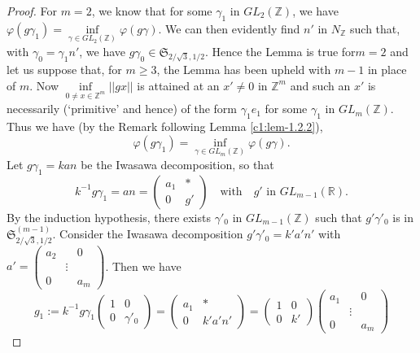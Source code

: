 \begin{proof}
For $m=2$, we know that for some $\gamma_{1}$ in $GL_{2}(\mathbb{Z})$,
we have $\varphi(g\gamma_{1})=\inf\limits_{\gamma\in
  GL_{2}(\mathbb{Z})}\varphi(g\gamma)$. We can then evidently find
$n'$ in $N_{\mathbb{Z}}$ such that, with $\gamma_{0}=\gamma_{1}n'$, we
have $g\gamma_{0}\in\mathfrak{S}_{2/\sqrt{3},1/2}$. Hence the Lemma is
true for\pageoriginale $m=2$ and let us suppose that, for $m\geq 3$,
the Lemma has been upheld with  $m-1$ in place of $m$. Now
$\inf\limits_{0\neq x\in \mathbb{Z}^{m}}||gx||$ is attained at an
$x'\neq 0$ in $\mathbb{Z}^{m}$ and such an $x'$ is necessarily
(`primitive' and hence) of the form $\gamma_{1}e_{1}$ for some
$\gamma_{1}$ in $GL_{m}(\mathbb{Z})$. Thus we have (by the Remark
following Lemma \ref{c1:lem-1.2.2}),
\begin{equation*}
\varphi(g\gamma_{1})=\inf\limits_{\gamma\in
  GL_{m}(\mathbb{Z})}\varphi(g\gamma).\tag{11}\label{c1:eq11} 
\end{equation*}
Let $g\gamma_{1}=kan$ be the Iwasawa decomposition, so that
$$
k^{-1}g\gamma_{1}=an=
\begin{pmatrix}
a_{1} & \ast\\
0 & g'
\end{pmatrix}
\quad\text{with}\quad 
g'\text{ \ in \ } GL_{m-1}(\mathbb{R}).
$$
By the induction hypothesis, there exists $\gamma'_{0}$ in
$GL_{m-1}(\mathbb{Z})$ such that $g'\gamma'_{0}$ is in
$\mathfrak{S}^{(m-1)}_{2/\sqrt{3},1/2}$. Consider the Iwasawa
decomposition $g'\gamma'_{0}=k'a'n'$ with
$a'=\left(\begin{smallmatrix} a_{2} & & 0\\ & \vdots & \\ 0 & & a_{m}
\end{smallmatrix}\right)$. Then we have
$$
g_{1}:=k^{-1}g\gamma_{1}
\begin{pmatrix}
1 & 0\\
0 & \gamma'_{0}
\end{pmatrix}
=
\begin{pmatrix}
a_{1} & \ast\\
0 & k'a'n'
\end{pmatrix}
=
\begin{pmatrix}
1 & 0\\
0 & k'
\end{pmatrix}
\begin{pmatrix}
a_{1} & & 0\\
 & \vdots & \\
0 & & a_{m}
\end{pmatrix}
$$
\end{proof}
